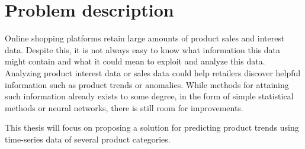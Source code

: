 
\section{Problem description}
\label{section:Introduction:ProblemDescription}
Online shopping platforms retain large amounts of product sales and interest data.
Despite this, it is not always easy to know what information this data might contain and what it could mean to exploit and analyze this data.
Analyzing product interest data or sales data could help retailers discover helpful information such as product trends or anomalies.
While methods for attaining such information already exists to some degree, in the form of simple statistical methods or neural networks,
there is still room for improvements.


This thesis will focus on proposing a solution for predicting product trends using time-series data of several product categories.


